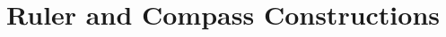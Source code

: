 \documentclass[a4paper]{article}
\begin{document}
\section{Ruler and Compass Constructions}
\end{document}
